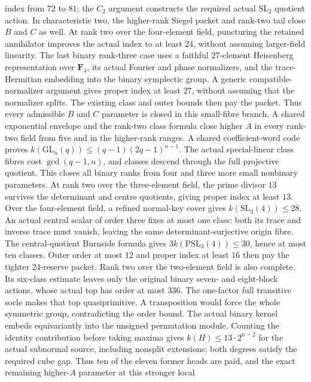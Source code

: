 index from $72$ to $81$; the $C_2$ argument constructs the required
actual $\mathrm{SL}_2$ quotient action. In characteristic two, the
higher-rank Siegel packet and rank-two tail close $B$ and $C$ as well.
At rank two over the
four-element field, puncturing the retained annihilator improves the
actual index to at least $24$, without assuming larger-field linearity.
The last binary rank-three case uses a faithful $27$-element Heisenberg
representation over $\mathbf F_4$, its actual Fourier and phase
normalizers, and the trace-Hermitian embedding into the binary
symplectic group. A generic compatible-normalizer argument gives proper
index at least $27$, without assuming that the normalizer splits. The
existing class and outer bounds then pay the packet. Thus every
admissible $B$ and $C$ parameter is closed in this small-fibre branch.
A shared exponential envelope and the rank-two class formula close
higher $A$ in every rank-two field from five and in the higher-rank
ranges. A shared coefficient-word code proves
$k(\mathrm{GL}_n(q))\leq(q-1)(2q-1)^{n-1}$. The actual special-linear
class fibres cost $\gcd(q-1,n)$, and classes descend through the full
projective quotient. This closes all binary ranks from four and three
more small nonbinary parameters. At rank two over the three-element
field, the prime divisor $13$ survives the determinant and centre
quotients, giving proper index at least $13$. Over the four-element
field, a refined normal-key cover gives $k(\mathrm{SL}_3(4))\leq28$.
An actual central scalar of order three fixes at most one class:
both its trace and inverse trace must vanish, leaving the same
determinant-surjective origin fibre. The central-quotient Burnside
formula gives $3k(\mathrm{PSL}_3(4))\leq30$, hence at most ten classes.
Outer order at most $12$ and proper index at least $16$ then pay the
tighter $24$-reserve packet. Rank two over the two-element field is
also complete. Its six-class estimate leaves only the original binary
seven- and eight-block actions, whose actual top has order at most $336$.
The one-factor full transitive socle makes that top quasiprimitive.
A transposition would force the whole symmetric group, contradicting
the order bound. The actual binary kernel embeds equivariantly into
the unsigned permutation module. Counting the identity contribution
before taking maxima gives $k(H)\leq13\cdot2^{n-2}$ for the actual
subnormal source, including nonsplit extensions; both degrees satisfy
the required cube gap. Thus ten of the eleven former heads are paid,
and the exact remaining higher-$A$ parameter at this stronger local
